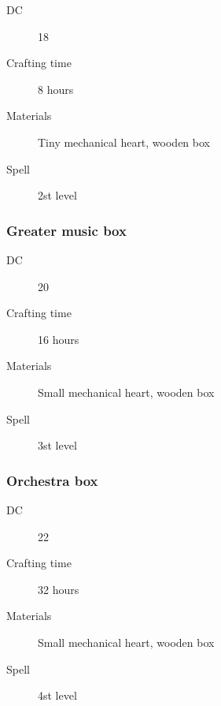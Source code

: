 \begin{description}
\item [DC] 18
\item [Crafting time] 8 hours
\item [Materials] Tiny mechanical heart, wooden box
\item [Spell] 2st level
\end{description}

\subsubsection{Greater music box}

\begin{description}
\item [DC] 20
\item [Crafting time] 16 hours
\item [Materials] Small mechanical heart, wooden box
\item [Spell] 3st level
\end{description}

\subsubsection{Orchestra box}

\begin{description}
\item [DC] 22
\item [Crafting time] 32 hours
\item [Materials] Small mechanical heart, wooden box
\item [Spell] 4st level
\end{description}